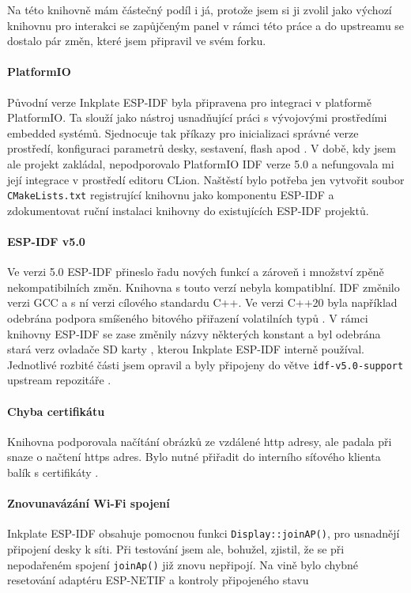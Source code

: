 Na této knihovně mám částečný podíl i já, protože jsem si ji zvolil jako výchozí knihovnu pro interakci se zapůjčeným panel v rámci této práce a do upstreamu se dostalo pár změn, které jsem připravil ve svém forku. 

\paragraph{PlatformIO} Původní verze Inkplate ESP-IDF byla připravena pro integraci v platformě PlatformIO. Ta slouží jako nástroj usnadňující práci s vývojovými prostředími embedded systémů. Sjednocuje tak příkazy pro inicializaci správné verze prostředí, konfiguraci parametrů desky, sestavení, flash apod \cite{WhatPlatformIOPlatformIO}. V době, kdy jsem ale projekt zakládal, nepodporovalo PlatformIO IDF verze 5.0 a nefungovala mi její integrace v prostředí editoru CLion. Naštěstí bylo potřeba jen vytvořit soubor \verb|CMakeLists.txt| registrující knihovnu jako komponentu ESP-IDF a zdokumentovat ruční instalaci knihovny do existujících ESP-IDF projektů.

\paragraph{ESP-IDF v5.0} Ve verzi 5.0 ESP-IDF přineslo řadu nových funkcí a zároveň i množství zpěně nekompatibilních změn. Knihovna s touto verzí nebyla kompatiblní. IDF změnilo verzi GCC a s ní verzi cílového standardu C++. Ve verzi C++20 byla například odebrána podpora smíšeného bitového přiřazení volatilních typů \cite{jtcDedeprecatingVolatileCompound}. V rámci knihovny ESP-IDF se zase změnily názvy některých konstant\cite{PeripheralsESP32S2ESPIDF} a byl odebrána stará verz ovladače SD karty \cite{StorageESP32S2ESPIDF}, kterou Inkplate ESP-IDF interně používal. Jednotlivé rozbité části jsem opravil a byly připojeny do větve \verb|idf-v5.0-support| upstream repozitáře \cite{WIPInitialSupport}. 

\paragraph{Chyba certifikátu} Knihovna podporovala načítání obrázků ze vzdálené http adresy, ale padala při snaze o načtení https adres. Bylo nutné přiřadit do interního síťového klienta balík s certifikáty \cite{MenuconfigVariantSelection}.

\paragraph{Znovunavázání Wi-Fi spojení} Inkplate ESP-IDF obsahuje pomocnou funkci \verb|Display::joinAP()|, pro usnadnějí připojení desky k síti. Při testování jsem ale, bohužel, zjistil, že se při nepodařeném spojení \verb|joinAp()| již znovu nepřipojí. Na vině bylo chybné resetování adaptéru ESP-NETIF a kontroly připojeného stavu \cite{MenuconfigVariantSelection}



